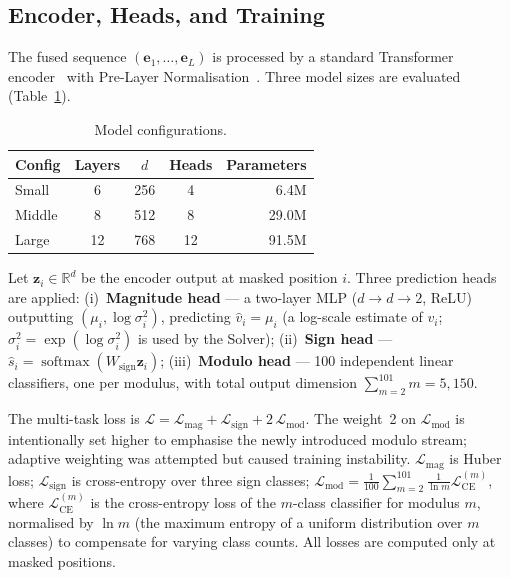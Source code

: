\subsection{Encoder, Heads, and Training}
\label{sec:encoder}

The fused sequence $(\mathbf{e}_1, \ldots, \mathbf{e}_L)$ is processed by a standard
Transformer encoder~\cite{vaswani2017attention} with Pre-Layer Normalisation~\cite{xiong2020layer}.
Three model sizes are evaluated (Table~\ref{tab:models}).

\begin{table}[htbp]
\caption{Model configurations.}
\label{tab:models}
\centering
\begin{tabular}{lcccr}
\hline
Config  & Layers & $d$ & Heads & Parameters \\
\hline
Small   & 6      & 256 & 4     & 6.4M       \\
Middle  & 8      & 512 & 8     & 29.0M      \\
Large   & 12     & 768 & 12    & 91.5M      \\
\hline
\end{tabular}
\end{table}

Let $\mathbf{z}_i \in \mathbb{R}^d$ be the encoder output at masked position $i$.
Three prediction heads are applied: (i)~\textbf{Magnitude head} --- a two-layer MLP
($d \to d \to 2$, ReLU) outputting $(\mu_i, \log\sigma_i^2)$, predicting $\hat{v}_i = \mu_i$
(a log-scale estimate of $v_i$; $\sigma_i^2 = \exp(\log\sigma_i^2)$ is used by the Solver);
(ii)~\textbf{Sign head} --- $\hat{s}_i = \operatorname{softmax}(W_{\text{sign}}\mathbf{z}_i)$;
(iii)~\textbf{Modulo head} --- 100 independent linear classifiers, one per modulus, with total
output dimension $\sum_{m=2}^{101}m = 5{,}150$.

The multi-task loss is $\mathcal{L} = \mathcal{L}_{\text{mag}} + \mathcal{L}_{\text{sign}} + 2\,\mathcal{L}_{\text{mod}}$.
The weight~2 on $\mathcal{L}_{\text{mod}}$ is intentionally set higher to emphasise the
newly introduced modulo stream; adaptive weighting was attempted but caused training instability.
$\mathcal{L}_{\text{mag}}$ is Huber loss; $\mathcal{L}_{\text{sign}}$ is cross-entropy over
three sign classes; $\mathcal{L}_{\text{mod}} = \frac{1}{100}\sum_{m=2}^{101}
\frac{1}{\ln m}\mathcal{L}_{\text{CE}}^{(m)}$, where $\mathcal{L}_{\text{CE}}^{(m)}$ is the
cross-entropy loss of the $m$-class classifier for modulus $m$, normalised by $\ln m$
(the maximum entropy of a uniform distribution over $m$ classes) to compensate for varying class counts.
All losses are computed only at masked positions.

